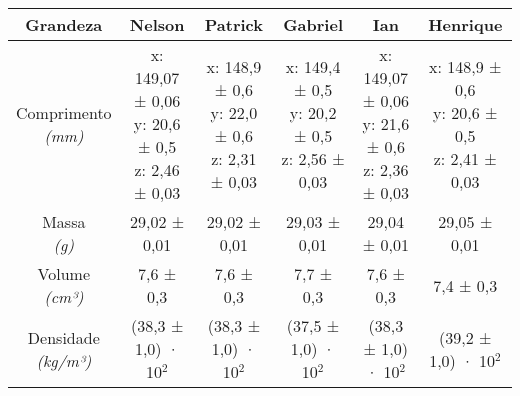 \documentclass{article}
\begin{document}
\begin{table}[h!]
\centering
\begin{tabular}{c c c c c c }
\toprule
Grandeza & Nelson & Patrick & Gabriel & Ian & Henrique\\
\midrule
\shortstack{Comprimento\\\textit{(mm)}} & \shortstack{x: 149,07 ± 0,06\\y: 20,6 ± 0,5\\z: 2,46 ± 0,03} & \shortstack{x: 148,9 ± 0,6\\y: 22,0 ± 0,6\\z: 2,31 ± 0,03} & \shortstack{x: 149,4 ± 0,5\\y: 20,2 ± 0,5\\z: 2,56 ± 0,03} & \shortstack{x: 149,07 ± 0,06\\y: 21,6 ± 0,6\\z: 2,36 ± 0,03} & \shortstack{x: 148,9 ± 0,6\\y: 20,6 ± 0,5\\z: 2,41 ± 0,03}\\[4pt]
\shortstack{Massa\\\textit{(g)}} & 29,02 ± 0,01 & 29,02 ± 0,01 & 29,03 ± 0,01 & 29,04 ± 0,01 & 29,05 ± 0,01\\[4pt]
\shortstack{Volume\\\textit{(cm³)}} & 7,6 ± 0,3 & 7,6 ± 0,3 & 7,7 ± 0,3 & 7,6 ± 0,3 & 7,4 ± 0,3\\[4pt]
\shortstack{Densidade\\\textit{(kg/m³)}} & (38,3 ± 1,0) · 10$^{2}$ & (38,3 ± 1,0) · 10$^{2}$ & (37,5 ± 1,0) · 10$^{2}$ & (38,3 ± 1,0) · 10$^{2}$ & (39,2 ± 1,0) · 10$^{2}$\\[4pt]
\bottomrule
\end{tabular}
\end{table}
\end{document}
